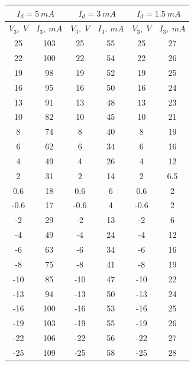 \documentclass[11pt]{article}
\begin{document}
\begin{table}[H]
    \centering
    \begin{tabular}{|c|c|c|c|c|c|}
    \hline
    \multicolumn{2}{|c|}{\(I_d = 5\: mA\)}& \multicolumn{2}{|c|}{\(I_d = 3\: mA\)} & \multicolumn{2}{|c|}{\(I_d = 1.5\: mA\)} \\\hline
    \(V_3,\; V\) & \(I_3,\: mA\) & \(V_3,\; V\) & \(I_3,\: mA\) & \(V_3,\; V\) & \(I_3,\: mA\)\\\hline
    25 & 103  & 25          & 55& 25           & 27 \\\hline
    22 & 100  & 22          & 54& 22           & 26 \\\hline
    19 & 98   & 19          & 52& 19           & 25 \\\hline
    16 & 95   & 16          & 50& 16           & 24 \\\hline
    13 & 91   & 13          & 48& 13           & 23 \\\hline
    10 & 82   & 10          & 45& 10           & 21 \\\hline
    8  & 74   & 8           & 40& 8            & 19 \\\hline
    6  & 62   & 6           & 34& 6            & 16 \\\hline
    4  & 49   & 4           & 26& 4            & 12 \\\hline
    2  & 31   & 2           & 14& 2            & 6.5\\\hline
    0.6& 18   & 0.6         & 6 & 0.6          & 2  \\\hline
    -0.6 &17  & -0.6        & 4 & -0.6         & 2  \\\hline
    -2 & 29   & -2          & 13& -2           & 6  \\\hline
    -4 & 49   & -4          & 24& -4           & 12 \\\hline
    -6 & 63   & -6          & 34& -6           & 16 \\\hline
    -8 & 75   & -8          & 41& -8           & 19 \\\hline
    -10& 85   & -10         & 47& -10          & 22 \\\hline
    -13& 94   & -13         & 50& -13          & 24 \\\hline
    -16& 100  & -16         & 53& -16          & 25 \\\hline
    -19& 103  & -19         & 55& -19          & 26 \\\hline
    -22& 106  & -22         & 56& -22          & 27 \\\hline
    -25& 109  & -25         & 58& -25          & 28 \\\hline
    \end{tabular}
\end{table}
\end{document}

